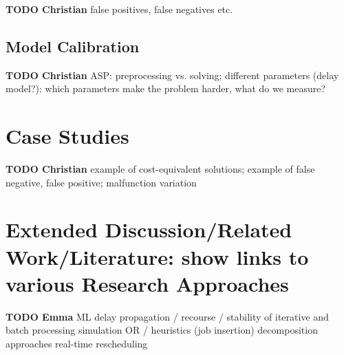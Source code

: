 \documentclass{article}
\begin{document}
\begin{mdframed}
{\bf TODO Christian} false positives, false negatives etc.
\end{mdframed}

\subsection{Model Calibration}

\begin{mdframed}
{\bf TODO Christian} ASP: preprocessing vs. solving; different parameters (delay model?): which parameters make the problem harder, what do we measure?
\end{mdframed}


\section{Case Studies}\label{sec:CaseStudies}

\begin{mdframed}
{\bf TODO Christian} example of cost-equivalent solutions; example of false negative, false positive; malfunction variation
\end{mdframed}


\section{Extended Discussion/Related Work/Literature: show links to various Research Approaches}

\begin{mdframed}
{\bf TODO Emma}         ML
        delay propagation / recourse / stability of iterative and batch processing
        simulation
        OR / heuristics (job insertion)
        decomposition approaches
        real-time rescheduling
        
\end{mdframed}        



\end{document}
